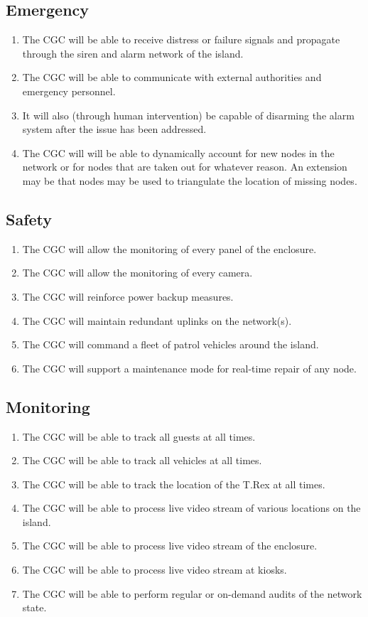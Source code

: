 \documentclass[12pt]{article}
\begin{document}
	\subsection{Emergency}
	\begin{enumerate}
		\item The CGC will be able to receive distress or failure signals and propagate
		through the siren and alarm network of the island. 
		\item The CGC will be able to communicate with external authorities and emergency personnel.
		\item It will also (through human intervention) be capable of disarming the alarm system after 
		the issue has been addressed.
		\item The CGC will will be able to dynamically account for new nodes in the network or for nodes that are
		taken out for whatever reason. An extension may be that nodes may be used to triangulate the location of missing
		nodes.
	\end{enumerate}

	\subsection{Safety} 
	\begin{enumerate}
		\item The CGC will allow the monitoring of every panel of the enclosure.
		\item The CGC will allow the monitoring of every camera.
		\item The CGC will reinforce power backup measures.
		\item The CGC will maintain redundant uplinks on the network(s).
		\item The CGC will command a fleet of patrol vehicles around the island.
		\item The CGC will support a maintenance mode for real-time repair of any node.
	\end{enumerate}
	
	\subsection{Monitoring}
	\begin{enumerate}
		\item The CGC will be able to track all guests at all times.
		\item The CGC will be able to track all vehicles at all times.
		\item The CGC will be able to track the location of the T.Rex at all times.
		\item The CGC will be able to process live video stream of various locations on the island.
		\item The CGC will be able to process live video stream of the enclosure.
		\item The CGC will be able to process live video stream at kiosks.
		\item The CGC will be able to perform regular or on-demand audits of the network state.
	\end{enumerate}
	
\end{document}
